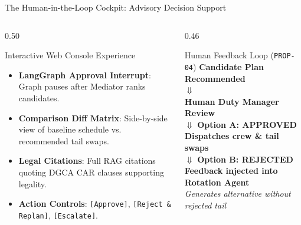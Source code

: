 \documentclass[aspectratio=169,10pt]{beamer}
\begin{document}
\begin{frame}{The Human-in-the-Loop Cockpit: Advisory Decision Support}
  \begin{columns}[t]
    \begin{column}{0.50\textwidth}
      \begin{block}{Interactive Web Console Experience}
        \begin{itemize}\footnotesize
          \item \textbf{LangGraph Approval Interrupt}: Graph pauses after Mediator ranks candidates.
          \item \textbf{Comparison Diff Matrix}: Side-by-side view of baseline schedule vs. recommended tail swaps.
          \item \textbf{Legal Citations}: Full RAG citations quoting DGCA CAR clauses supporting legality.
          \item \textbf{Action Controls}: \texttt{[Approve]}, \texttt{[Reject \& Replan]}, \texttt{[Escalate]}.
        \end{itemize}
      \end{block}
    \end{column}
    \begin{column}{0.46\textwidth}
      \begin{block}{Human Feedback Loop (\texttt{PROP-04})}
        \centering\footnotesize
        \textbf{Candidate Plan Recommended}\\
        $\Downarrow$\\
        \textbf{Human Duty Manager Review}\\
        $\Downarrow$ \textbf{Option A: APPROVED}\\
        \textbf{\color{EmeraldGreen}Dispatches crew \& tail swaps}\\
        $\Downarrow$ \textbf{Option B: REJECTED}\\
        \textbf{\color{CrimsonRed}Feedback injected into Rotation Agent}\\
        \textit{Generates alternative without rejected tail}
      \end{block}
    \end{column}
  \end{columns}
\end{frame}
\end{document}
